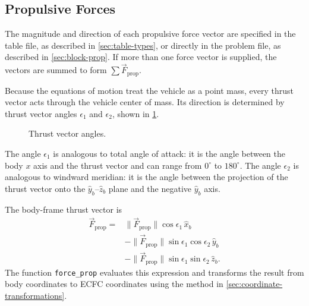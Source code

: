 \subsection{Propulsive Forces}\label{sec:propulsive-forces}

The magnitude and direction of each propulsive force vector are specified in the
table file, as described in \cref{sec:table-types}, or directly in the problem file,
as described in \cref{sec:block-prop}. If more than one force vector is supplied,
the vectors are summed to form $\sum\vec F_{\mathrm{prop}}$.

Because the equations of motion treat the vehicle as a point mass, every thrust
vector acts through the vehicle center of mass. Its direction is determined by thrust
vector angles $\epsilon_1$ and $\epsilon_2$, shown in
\cref{fig:chapter2-thrust-vector-angles}.

\begin{figure}[htbp]
  \centering
  \resizebox{0.86\linewidth}{!}{}
  \caption{Thrust vector angles.}
  \label{fig:chapter2-thrust-vector-angles}
\end{figure}

The angle $\epsilon_1$ is analogous to total angle of attack: it is the angle between
the body $x$ axis and the thrust vector and can range from $0^\circ$ to
$180^\circ$. The angle $\epsilon_2$ is analogous to windward meridian: it is the
angle between the projection of the thrust vector onto the $\hat y_b$--$\hat z_b$
plane and the negative $\hat y_b$ axis.

The body-frame thrust vector is
\begin{equation}
  \begin{aligned}
  \vec F_{\mathrm{prop}}
  ={}&\lVert\vec F_{\mathrm{prop}}\rVert\cos\epsilon_1\,\hat x_b\\
    &-\lVert\vec F_{\mathrm{prop}}\rVert
      \sin\epsilon_1\cos\epsilon_2\,\hat y_b\\
    &-\lVert\vec F_{\mathrm{prop}}\rVert
      \sin\epsilon_1\sin\epsilon_2\,\hat z_b.
  \end{aligned}
  \label{eq:propulsive-force-vector}
\end{equation}
The function \texttt{force\_prop} evaluates this expression and transforms the
result from body coordinates to ECFC coordinates using the method in
\cref{sec:coordinate-transformations}.


